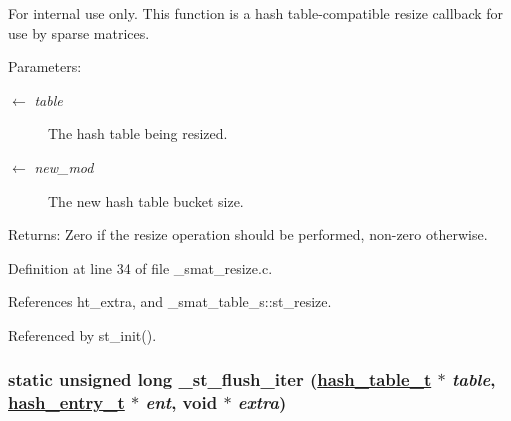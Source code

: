 \begin{Desc}
\item[For internal use only.]
This function is a hash table-compatible resize callback for use by sparse matrices.

\begin{Desc}
\item[Parameters:]
\begin{description}
\item[\mbox{$\leftarrow$} {\em table}]The hash table being resized. \item[\mbox{$\leftarrow$} {\em new\_\-mod}]The new hash table bucket size.\end{description}
\end{Desc}
\begin{Desc}
\item[Returns:]Zero if the resize operation should be performed, non-zero otherwise.\end{Desc}
\end{Desc}


Definition at line 34 of file \_\-smat\_\-resize.c.

References ht\_\-extra, and \_\-smat\_\-table\_\-s::st\_\-resize.

Referenced by st\_\-init().\hypertarget{group__dbprim__smat_ga30}{
\subsubsection[\_\-st\_\-flush\_\-iter]{\setlength{\rightskip}{0pt plus 5cm}static unsigned long \_\-st\_\-flush\_\-iter (\hyperlink{struct__hash__table__s}{hash\_\-table\_\-t} $\ast$ {\em table}, \hyperlink{struct__hash__entry__s}{hash\_\-entry\_\-t} $\ast$ {\em ent}, void $\ast$ {\em extra})}}
\label{group__dbprim__smat_ga30}


